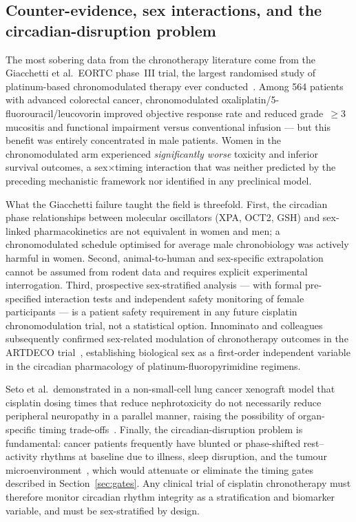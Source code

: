 \documentclass[preprint,review,12pt]{elsarticle}
\begin{document}
\subsection{Counter-evidence, sex interactions, and the circadian-disruption
  problem}

The most sobering data from the chronotherapy literature come from the
Giacchetti et al.\ EORTC phase~III trial, the largest randomised study of
platinum-based chronomodulated therapy ever
conducted~\cite{Giacchetti2006}.  Among 564 patients with advanced
colorectal cancer, chronomodulated oxaliplatin/5-fluorouracil/leucovorin
improved objective response rate and reduced grade~$\geq$3 mucositis and
functional impairment versus conventional infusion --- but this benefit was
entirely concentrated in male patients.  Women in the chronomodulated arm
experienced \emph{significantly worse} toxicity and inferior survival
outcomes, a sex$\times$timing interaction that was neither predicted by
the preceding mechanistic framework nor identified in any preclinical model.

What the Giacchetti failure taught the field is threefold.  First, the
circadian phase relationships between molecular oscillators (XPA, OCT2,
GSH) and sex-linked pharmacokinetics are not equivalent in women and men;
a chronomodulated schedule optimised for average male chronobiology was
actively harmful in women.  Second, animal-to-human and sex-specific
extrapolation cannot be assumed from rodent data and requires explicit
experimental interrogation.  Third, prospective sex-stratified analysis
--- with formal pre-specified interaction tests and independent safety
monitoring of female participants --- is a patient safety requirement
in any future cisplatin chronomodulation trial, not a statistical option.
Innominato and colleagues subsequently confirmed sex-related modulation of
chronotherapy outcomes in the ARTDECO trial~\cite{Innominato2020},
establishing biological sex as a first-order independent variable in the
circadian pharmacology of platinum-fluoropyrimidine regimens.

Seto et al.\ demonstrated in a non-small-cell lung cancer xenograft model
that cisplatin dosing times that reduce nephrotoxicity do not necessarily
reduce peripheral neuropathy in a parallel manner, raising the possibility
of organ-specific timing trade-offs~\cite{Seto2016}.  Finally, the
circadian-disruption problem is fundamental: cancer patients frequently
have blunted or phase-shifted rest--activity rhythms at baseline due to
illness, sleep disruption, and the tumour
microenvironment~\cite{Mormont2000, Innominato2014}, which would attenuate
or eliminate the timing gates described in Section~\ref{sec:gates}.
Any clinical trial of cisplatin chronotherapy must therefore monitor
circadian rhythm integrity as a stratification and biomarker variable,
and must be sex-stratified by design.
\end{document}

